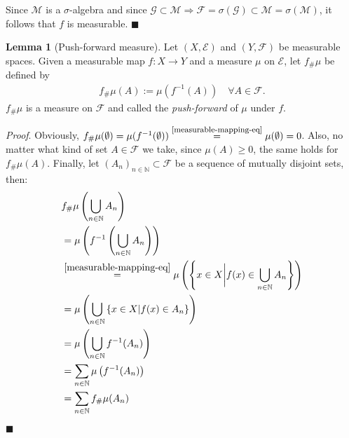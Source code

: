 \documentclass[12pt, a4paper]{article}
\numberwithin{equation}{section}
\theoremstyle{definition}
\theoremstyle{definition}
\newtheorem{lemma}[thm]{Lemma} %
\begin{document}
	Since $\mathcal M$ is a $\sigma$-algebra and since $\mathcal G\subset \mathcal M \Rightarrow \mathcal F = \sigma(\mathcal G)\subset \mathcal M = \sigma(\mathcal M) $, it follows that $f$ is measurable. 
	 \newline \qquad\qquad\qquad\qquad\qquad\qquad\qquad\qquad\qquad\qquad\qquad\qquad\qquad\qquad\qquad\qquad\qquad\qquad\qquad\qquad\quad$\blacksquare$

	\begin{lemma}[Push-forward measure]\label{push-forward-measure}
		Let $(X, \mathcal E)$ and $(Y, \mathcal F)$ be measurable spaces. Given a measurable map $f: X\rightarrow Y$ and a measure $\mu$ on $\mathcal E$, let $f_{\#}\mu$ be defined by 
		\begin{align}
			f_{\#}\mu(A) := \mu(f^{-1}(A)) \quad \forall A\in \mathcal F. 
		\end{align}
		$f_{\#}\mu$ is a measure on $\mathcal F$ and called the \textit{push-forward} of $\mu$ under $f$. 
	\end{lemma}

	\noindent 
	\textit{Proof}. Obviously, $f_{\#}\mu(\emptyset) = \mu(f^{-1}(\emptyset)) \overset{\footnotesize\eqref{measurable-mapping-eq}}{=} \mu(\emptyset) = 0$. Also, no matter what kind of set $A\in \mathcal F$ we take, since $\mu(A) \geq 0$, the same holds for $f_{\#}\mu(A)$. Finally, let $(A_n)_{n\in\mathbb{N}} \subset \mathcal F$ be a sequence of mutually disjoint sets, then: 
	\begin{align}
		&f_{\#}\mu\left(\bigcup_{n\in\mathbb N}A_n \right) 
					\\ &= 
		\mu\left(f^{-1}\left(\bigcup_{n\in\mathbb N}A_n\right) \right) 
					\\ &\overset{\eqref{measurable-mapping-eq}}{=}
		\mu\left( \left\{ x\in X \bigg\vert f(x) \in  \bigcup_{n\in\mathbb N}A_n \right\}\right) 
					\\ &= 		
		\mu\left( \bigcup_{n\in\mathbb N}\left\{ x\in X \vert f(x)\in A_n \right\} \right) 
					\\ &=
		\mu\left( \bigcup_{n\in\mathbb{N}}f^{-1}(A_n) \right)
					\\ &=
		\sum_{n\in\mathbb N}\mu\left(f^{-1}(A_n)\right)
					\\ &=
		\sum_{n\in\mathbb{N}}f_{\#}\mu(A_n) 
	\end{align} 
	\qquad\qquad\qquad\qquad\qquad\qquad\qquad\qquad\qquad\qquad\qquad\qquad\qquad\qquad\qquad\qquad\qquad\qquad\qquad\qquad\qquad\quad$\blacksquare$
	
\end{document}
